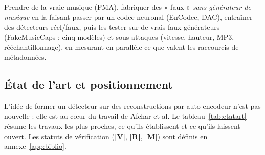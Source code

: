 \documentclass[11pt,a4paper]{article}
\newcommand{\sV}{\textbf{[V]}}
\newcommand{\sR}{\textbf{[R]}}
\newcommand{\sM}{\textbf{[M]}}
\begin{document}
Prendre de la vraie musique (FMA), fabriquer des « faux » \emph{sans générateur de musique} en la faisant passer par un codec neuronal (EnCodec, DAC), entraîner des détecteurs réel/faux, puis les tester sur de vrais faux générateurs (FakeMusicCaps : cinq modèles) et sous attaques (vitesse, hauteur, MP3, rééchantillonnage), en mesurant en parallèle ce que valent les raccourcis de métadonnées.

\subsection{État de l'art et positionnement}
\label{sec:etatart}

L'idée de former un détecteur sur des reconstructions par auto-encodeur n'est pas nouvelle : elle est au c\oe ur du travail de Afchar et al. Le tableau~\ref{tab:etatart} résume les travaux les plus proches, ce qu'ils établissent et ce qu'ils laissent ouvert. Les statuts de vérification (\sV, \sR, \sM) sont définis en annexe~\ref{app:biblio}.
\end{document}
